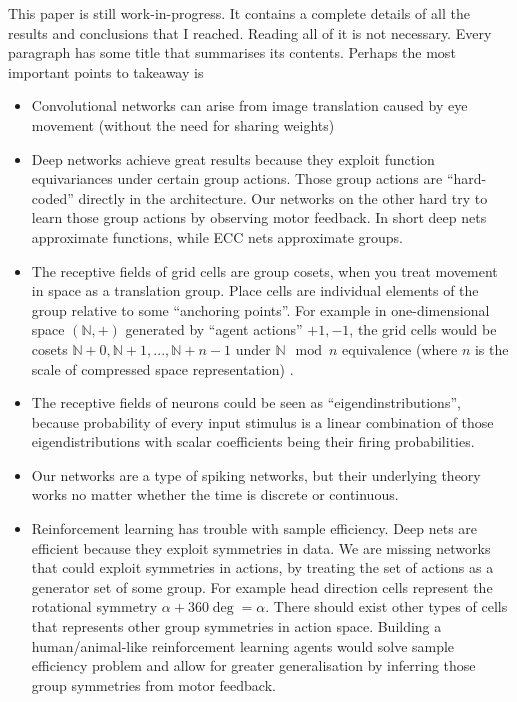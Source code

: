 \documentclass[12pt]{article}
\begin{document}
This paper is still work-in-progress. It contains a complete details of all the results and conclusions that I reached. Reading all of it is not necessary. Every paragraph has some title that summarises its contents. Perhaps the most important points to takeaway is 
\begin{itemize}
	\item Convolutional networks can arise from image translation caused by eye movement (without the need for sharing weights)
	\item Deep networks achieve great results because they exploit function equivariances under certain group actions. Those group actions are ``hard-coded'' directly in the architecture. Our networks on the other hard try to learn those group actions by observing motor feedback. In short deep nets approximate functions, while ECC nets approximate groups.
	\item The receptive fields of grid cells are group cosets, when you treat movement in space as a translation group. Place cells are individual elements of the group relative to some ``anchoring points''. For example in one-dimensional space $(\mathbb{N},+)$ generated by ``agent actions'' $+1,-1$, the grid cells would be cosets $\mathbb{N}+0,\mathbb{N}+1,...,\mathbb{N}+n-1$ under $\mathbb{N} \mod n$ equivalence (where $n$ is the scale of compressed space representation) .
	\item The receptive fields of neurons could be seen as ``eigendinstributions'', because probability of every input stimulus is a linear combination of those eigendistributions with scalar coefficients being their firing probabilities.
	\item Our networks are a type of spiking networks, but their underlying theory works no matter whether the time is discrete or continuous.
	\item Reinforcement learning has trouble with sample efficiency. Deep nets are efficient because they exploit symmetries in data. We are missing networks that could exploit symmetries in actions, by treating the set of actions as a generator set of some group. For example head direction cells represent the rotational symmetry  $\alpha + 360\deg = \alpha$. There should exist other types of cells that represents other group symmetries in action space. Building a human/animal-like reinforcement learning agents would solve sample efficiency problem and allow for greater generalisation by inferring those group symmetries from motor feedback.
\end{itemize}
\end{document}
